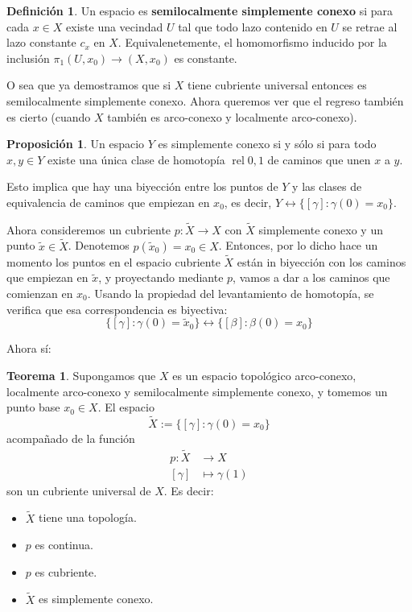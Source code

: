 \documentclass[spanish]{book}
\theoremstyle{definition}
\newtheorem*{defn}{Definición}
\newtheorem*{teo}{Teorema}
\newtheorem*{prop}{Proposición}
\DeclareMathOperator{\rel}{rel}
\begin{document}
\begin{defn}
	Un espacio es \textbf{semilocalmente simplemente conexo} si para cada $x\in X$ existe una vecindad $U$ tal que todo lazo contenido en $U$ se retrae al lazo constante $c_x$ en $X$. Equivalenetemente, el homomorfismo inducido por la inclusión $\pi_1(U,x_0)\to(X,x_0)$ es constante.
\end{defn}
O sea que ya demostramos que si $X$ tiene cubriente universal entonces es semilocalmente simplemente conexo. Ahora queremos ver que el regreso también es cierto (cuando $X$ también es arco-conexo y localmente arco-conexo).
\begin{prop}
	Un espacio $Y$ es simplemente conexo si y sólo si para todo $x,y\in Y$ existe una única clase de homotopía $\rel0,1$ de caminos que unen $x$ a $y$.
	
	Esto implica que hay una biyección entre los puntos de $Y$ y las clases de equivalencia de caminos que empiezan en $x_0$, es decir, $Y\leftrightarrow \{[\gamma]:\gamma(0)=x_0\}$.
	
	Ahora consideremos un cubriente $p:\tilde{X}\to X$ con $\tilde{X}$ simplemente conexo y un punto $\tilde{x}\in\tilde{X}$. Denotemos $p(\tilde{x}_0)=x_0\in X$. Entonces, por lo dicho hace un momento los puntos en el espacio cubriente $\tilde{X}$ están in biyección con los caminos que empiezan en $\tilde{x}$, y proyectando mediante $p$, vamos a dar a los caminos que comienzan en $x_0$. Usando la propiedad del levantamiento de homotopía, se verifica que esa correspondencia es biyectiva: \[\{[\gamma]:\gamma(0)=\tilde{x}_0\}\leftrightarrow\{[\beta]:\beta(0)=x_0\}\]
\end{prop}
Ahora sí:
\begin{teo}
	Supongamos que $X$ es un espacio topológico arco-conexo, localmente arco-conexo y semilocalmente simplemente conexo, y tomemos un punto base $x_0\in X$. El espacio \[\tilde{X}:=\{[\gamma]:\gamma(0)=x_0\}\]
	acompañado de la función
	\begin{align*}
		p:\tilde{X}&\to X\\
		[\gamma]&\mapsto\gamma(1)
	\end{align*}
	son un cubriente universal de $X$. Es decir:
	\begin{itemize}
		\item $\tilde{X}$ tiene una topología.
		\item $p$ es continua.
		\item $p$ es cubriente.
		\item $\tilde{X}$ es simplemente conexo.
	\end{itemize}
\end{teo}
\end{document}
